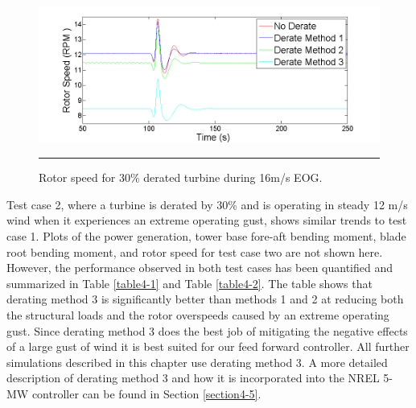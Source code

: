 \begin{figure}[htbp]
	\centering
		\includegraphics[trim = {1cm 0 2cm 0}, clip, width = \linewidth]{Figures/ch4Figures/fig4-4.png}
		\rule{35em}{0.5pt}
	\caption{Rotor speed for 30\% derated turbine during 16m/s EOG.}
	\label{fig4-4}
\end{figure}


Test case 2, where a turbine is derated by 30\% and is operating in steady 12 m/s wind when it experiences an extreme operating gust, shows similar trends to test case 1. Plots of the power generation, tower base fore-aft bending moment, blade root bending moment, and rotor speed for test case two are not shown here. However, the performance observed in both test cases has been quantified and summarized in Table \ref{table4-1} and Table \ref{table4-2}. The table shows that derating method 3 is significantly better than methods 1 and 2 at reducing both the structural loads and the rotor overspeeds caused by an extreme operating gust. Since derating method 3 does the best job of mitigating the negative effects of a large gust of wind it is best suited for our feed forward controller. All further simulations described in this chapter use derating method 3. A more detailed description of derating method 3 and how it is incorporated into the NREL 5-MW controller can be found in Section \ref{section4-5}.




